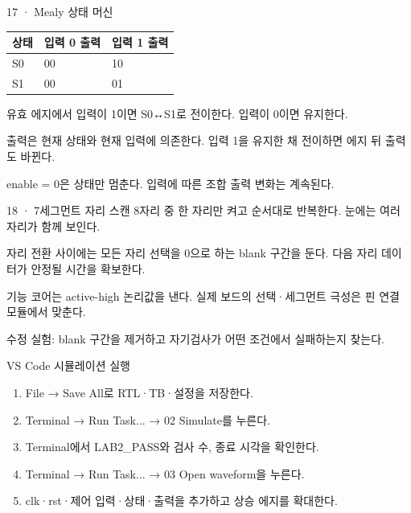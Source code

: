 \begin{frame}{17 · Mealy 상태 머신}
\small
\begin{center}\renewcommand{\arraystretch}{1.55}\begin{tabular}{lll}
상태 & 입력 0 출력 & 입력 1 출력\\\hline
S0 & 00 & 10\\
S1 & 00 & 01\\
\end{tabular}\end{center}유효 에지에서 입력이 1이면 S0↔S1로 전이한다. 입력이 0이면 유지한다.\par\vspace{0.26cm}출력은 현재 상태와 현재 입력에 의존한다. 입력 1을 유지한 채 전이하면 에지 뒤 출력도 바뀐다.\par\vspace{0.26cm}enable = 0은 상태만 멈춘다. 입력에 따른 조합 출력 변화는 계속된다.\par
\end{frame}

\begin{frame}{18 · 7세그먼트 자리 스캔}
\small
8자리 중 한 자리만 켜고 순서대로 반복한다. 눈에는 여러 자리가 함께 보인다.\par\vspace{0.26cm}자리 전환 사이에는 모든 자리 선택을 0으로 하는 blank 구간을 둔다. 다음 자리 데이터가 안정될 시간을 확보한다.\par\vspace{0.26cm}기능 코어는 active-high 논리값을 낸다. 실제 보드의 선택·세그먼트 극성은 핀 연결 모듈에서 맞춘다.\par\vspace{0.26cm}수정 실험: blank 구간을 제거하고 자기검사가 어떤 조건에서 실패하는지 찾는다.\par
\end{frame}

\begin{frame}{VS Code 시뮬레이션 실행}
\small
\begin{enumerate}
\item File → Save All로 RTL·TB·설정을 저장한다.
\item Terminal → Run Task... → 02 Simulate를 누른다.
\item Terminal에서 LAB2\_PASS와 검사 수, 종료 시각을 확인한다.
\item Terminal → Run Task... → 03 Open waveform을 누른다.
\item clk·rst·제어 입력·상태·출력을 추가하고 상승 에지를 확대한다.
\end{enumerate}
\end{frame}

